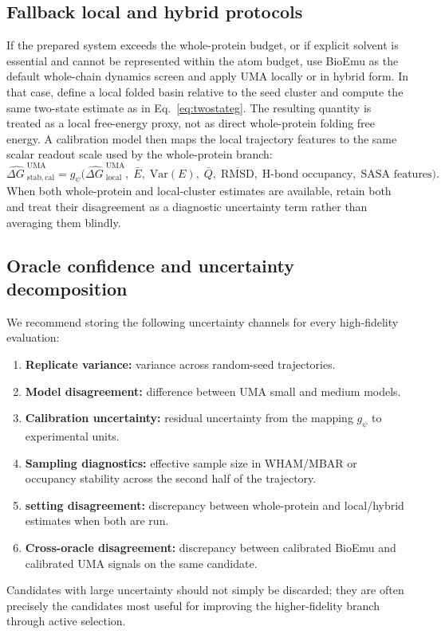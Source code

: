 \documentclass[11pt]{article}
\newcommand{\Var}{\ensuremath{\mathrm{Var}}}
\newcommand{\dG}{\ensuremath{\Delta G \ }}
\begin{document}
	\subsection{Fallback local and hybrid protocols}
	
	If the prepared system exceeds the whole-protein budget, or if explicit solvent is essential and cannot be represented within the atom budget, use BioEmu as the default whole-chain dynamics screen and apply UMA locally or in hybrid form. In that case, define a local folded basin relative to the seed cluster and compute the same two-state estimate as in Eq.~\eqref{eq:twostateg}. The resulting quantity is treated as a local free-energy proxy, not as direct whole-protein folding free energy. A calibration model then maps the local trajectory features to the same scalar readout scale used by the whole-protein branch:
	\begin{equation}
		\widehat{\dG}^{\mathrm{UMA}}_{\mathrm{stab,cal}} = g_\psi\Big(\widehat{\dG}^{\mathrm{UMA}}_{\mathrm{local}},\; \bar E,\; \Var(E),\; \bar Q,\; \overline{\mathrm{RMSD}},\; \text{H-bond occupancy},\; \text{SASA features}\Big).
	\end{equation}
	When both whole-protein and local-cluster estimates are available, retain both and treat their disagreement as a diagnostic uncertainty term rather than averaging them blindly.
	
	\subsection{Oracle confidence and uncertainty decomposition}
	
	We recommend storing the following uncertainty channels for every high-fidelity evaluation:
	\begin{enumerate}[leftmargin=1.5em]
		\item \textbf{Replicate variance:} variance across random-seed trajectories.
		\item \textbf{Model disagreement:} difference between UMA small and medium models.
		\item \textbf{Calibration uncertainty:} residual uncertainty from the mapping $g_\psi$ to experimental units.
		\item \textbf{Sampling diagnostics:} effective sample size in WHAM/MBAR or occupancy stability across the second half of the trajectory.
		\item \textbf{setting disagreement:} discrepancy between whole-protein and local/hybrid estimates when both are run.
		\item \textbf{Cross-oracle disagreement:} discrepancy between calibrated BioEmu and calibrated UMA signals on the same candidate.
	\end{enumerate}
	Candidates with large uncertainty should not simply be discarded; they are often precisely the candidates most useful for improving the higher-fidelity branch through active selection.
\end{document}
